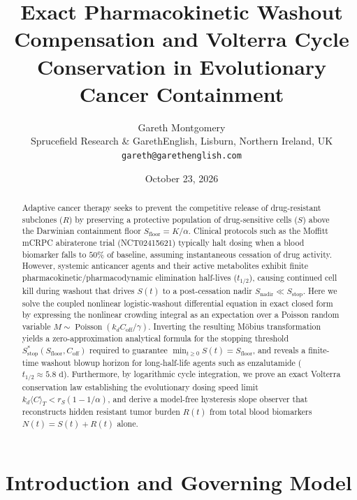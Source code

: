 \documentclass[11pt,reqno]{article}
\title{\textbf{Exact Pharmacokinetic Washout Compensation and Volterra Cycle Conservation in Evolutionary Cancer Containment}}
\author{Gareth Montgomery\\
\small Sprucefield Research \& GarethEnglish, Lisburn, Northern Ireland, UK\\
\small \texttt{gareth@garethenglish.com}}
\date{October 23, 2026}
\begin{document}
\maketitle

\begin{abstract}
Adaptive cancer therapy seeks to prevent the competitive release of drug-resistant subclones ($R$) by preserving a protective population of drug-sensitive cells ($S$) above the Darwinian containment floor $S_{\mathrm{floor}} = K/\alpha$. Clinical protocols such as the Moffitt mCRPC abiraterone trial (NCT02415621) typically halt dosing when a blood biomarker falls to $50\%$ of baseline, assuming instantaneous cessation of drug activity. However, systemic anticancer agents and their active metabolites exhibit finite pharmacokinetic/pharmacodynamic elimination half-lives ($t_{1/2}$), causing continued cell kill during washout that drives $S(t)$ to a post-cessation nadir $S_{\mathrm{nadir}} \ll S_{\mathrm{stop}}$. Here we solve the coupled nonlinear logistic-washout differential equation in exact closed form by expressing the nonlinear crowding integral as an expectation over a Poisson random variable $M \sim \operatorname{Poisson}(k_d C_{\mathrm{off}}/\gamma)$. Inverting the resulting M\"obius transformation yields a zero-approximation analytical formula for the stopping threshold $S_{\mathrm{stop}}^*(S_{\mathrm{floor}}, C_{\mathrm{off}})$ required to guarantee $\min_{t\ge 0} S(t) = S_{\mathrm{floor}}$, and reveals a finite-time washout blowup horizon for long-half-life agents such as enzalutamide ($t_{1/2}\approx 5.8\text{ d}$). Furthermore, by logarithmic cycle integration, we prove an exact Volterra conservation law establishing the evolutionary dosing speed limit $k_d\langle C\rangle_T < r_S(1-1/\alpha)$, and derive a model-free hysteresis slope observer that reconstructs hidden resistant tumor burden $R(t)$ from total blood biomarkers $N(t)=S(t)+R(t)$ alone.
\end{abstract}

\section{Introduction and Governing Model}
\end{document}
